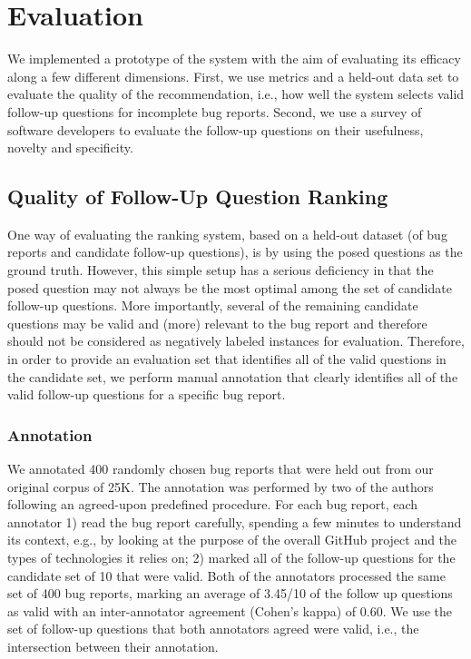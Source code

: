 \section{Evaluation}

We implemented a prototype of the system with the aim of evaluating its efficacy along
a few different dimensions. First, we use metrics and a held-out data set to evaluate the quality
of the recommendation, i.e., how well the system selects valid follow-up questions for incomplete bug reports.
Second, we use a survey of software developers to evaluate the follow-up questions on their usefulness, novelty and specificity.


\subsection{Quality of Follow-Up Question Ranking}

One way of evaluating the ranking system, based on a held-out dataset (of bug reports and candidate follow-up questions), is
by using the posed questions as the ground truth. However, this simple setup has a serious deficiency in that the posed question
may not always be the most optimal among the set of candidate follow-up questions. More importantly, several of
the remaining candidate questions may be valid and (more) relevant to the bug report and therefore should
not be considered as negatively labeled instances for evaluation. Therefore, in order to provide an evaluation
set that identifies all of the valid questions in the candidate set, we perform manual annotation that clearly
identifies all of the valid follow-up questions for a specific bug report.

\subsubsection{Annotation}
We annotated 400 randomly chosen bug reports that were held out from our original corpus of 25K. The annotation
was performed by two of the authors following an agreed-upon predefined procedure. For each bug report, each annotator 1)
read the bug report carefully, spending a few minutes to understand its context, e.g., by looking at the purpose of the overall GitHub
project and the types of technologies it relies on; 2) marked all of the follow-up questions for the candidate set of 10
that were valid. Both of the annotators processed the same set of 400 bug reports, marking an average of 3.45/10 of the follow up questions as valid with an inter-annotator agreement (Cohen's kappa) of 0.60.
We use the set of follow-up questions that both annotators agreed were valid, i.e., the intersection between their annotation.


